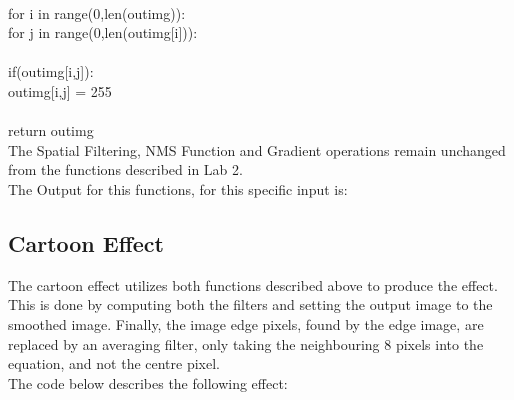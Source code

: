 \documentclass{article}
\begin{document}
	\\
	\indent for i in range(0,len(out\textunderscore img)):\\
	\indent \indent for j in range(0,len(out\textunderscore img[i])):\\
	\\
	\indent \indent \indent if(out\textunderscore img[i,j]):\\
	\indent \indent \indent \indent out\textunderscore img[i,j] = 255\\
	\\
	\indent return out\textunderscore img\\
	
	The Spatial Filtering, NMS Function and Gradient operations remain unchanged from the functions described in Lab 2.\\
	
	The Output for this functions, for this specific input is:\\
	
%		
%		

	\subsection{Cartoon Effect}

	The cartoon effect utilizes both functions described above to produce the effect. This is done by computing both the filters and setting the output image to the smoothed image. Finally, the image edge pixels, found by the edge image, are replaced by an averaging filter, only taking the neighbouring 8 pixels into the equation, and not the centre pixel.\\
	
	The code below describes the following effect:\\
	
\end{document}
